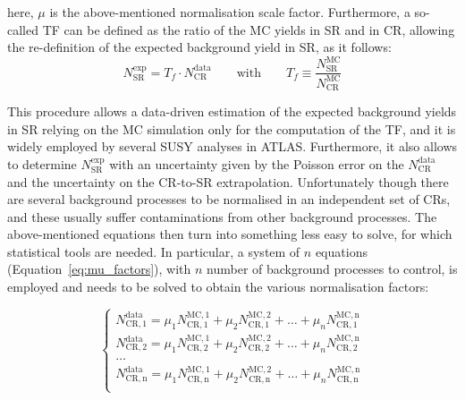 		\noindent here, $\mu$ is the above-mentioned normalisation scale factor. Furthermore, a so-called \ac{TF} can be defined as the ratio of the \ac{MC} yields in \ac{SR} and in \ac{CR}, allowing the re-definition of the expected background yield in \ac{SR}, as it follows: 
		\begin{equation}
			N_{\mathrm{SR}}^{\mathrm{exp}} = T_f \cdot N_{\mathrm{CR}}^{\mathrm{data}} \qquad \mathrm{with} \qquad T_f \equiv \frac{N_{\mathrm{SR}}^{\mathrm{MC}}}{N_{\mathrm{CR}}^{\mathrm{MC}}}
		\label{eq:tf}
		\end{equation}

		\noindent This procedure allows a data-driven estimation of the expected background yields in \ac{SR} relying on the \ac{MC} simulation only for the computation of the \ac{TF}, and it is widely employed by several \ac{SUSY} analyses in \ac{ATLAS}. Furthermore, it also allows to determine $N_{\mathrm{SR}}^{\mathrm{exp}}$ with an uncertainty given by the Poisson error on the $N_{\mathrm{CR}}^{\mathrm{data}}$ and the uncertainty on the \ac{CR}-to-\ac{SR} extrapolation. Unfortunately though there are several background processes to be normalised in an independent set of \acp{CR}, and these usually suffer contaminations from other background processes. The above-mentioned equations then turn into something less easy to solve, for which statistical tools are needed. In particular, a system of $n$ equations (Equation~\ref{eq:mu_factors}), with $n$ number of background processes to control, is employed and needs to be solved to obtain the various normalisation factors:

		\begin{equation}
			\begin{cases}
				N_{\mathrm{CR,1}}^{\mathrm{data}} = \mu_1 N_{\mathrm{CR,1}}^{\mathrm{MC,1}} + \mu_2 N_{\mathrm{CR,1}}^{\mathrm{MC,2}} + \dots + \mu_n N_{\mathrm{CR,1}}^{\mathrm{MC,n}} \\
				N_{\mathrm{CR,2}}^{\mathrm{data}} = \mu_1 N_{\mathrm{CR,2}}^{\mathrm{MC,1}} + \mu_2 N_{\mathrm{CR,2}}^{\mathrm{MC,2}} + \dots + \mu_n N_{\mathrm{CR,2}}^{\mathrm{MC,n}} \\
				\dots \\
				N_{\mathrm{CR,n}}^{\mathrm{data}} = \mu_1 N_{\mathrm{CR,n}}^{\mathrm{MC,1}} + \mu_2 N_{\mathrm{CR,n}}^{\mathrm{MC,2}} + \dots + \mu_n N_{\mathrm{CR,n}}^{\mathrm{MC,n}} \\
			\end{cases}
		\label{eq:mu_factors}
		\end{equation}

